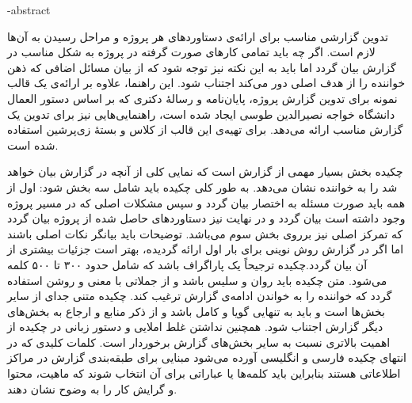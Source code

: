 \fa-abstract{
تدوین گزارشی مناسب برای ارائه‌ی دستاوردهای هر پروژه‌ و مراحل رسیدن به آن‌ها لازم است. اگر چه باید تمامی کارهای صورت گرفته در پروژه به شکل مناسب در گزارش بیان گردد اما باید به این نکته نیز توجه شود که از بیان مسائل اضافی که ذهن خواننده را از هدف اصلی دور می‌کند اجتناب شود. این راهنما، علاوه بر ارائه‌ی یک قالب نمونه‌ برای تدوین گزارش پروژه، پایان‌نامه و رسالهٔ دکتری که بر اساس دستور العمال دانشگاه خواجه نصیرالدین طوسی ایجاد شده است، راهنمایی‌هایی نیز برای تدوین یک گزارش مناسب ارائه می‌دهد. برای تهیه‌ی این قالب از کلاس 
و بستهٔ زی‌پرشین استفاده شده است.

چکیده بخش بسیار مهمی از گزارش است که نمایی کلی از آنچه در گزارش بیان خواهد شد را به خواننده نشان می‌دهد. به طور کلی چکیده باید شامل سه بخش شود: اول از همه باید صورت مسئله به اختصار بیان گردد و سپس مشکلات اصلی که در مسیر پروژه وجود داشته است بیان گردد و در نهایت نیز دستاوردهای حاصل شده از پروژه بیان گردد که تمرکز اصلی نیز برروی بخش سوم می‌باشد. توضیحات باید بیانگر نکات اصلی باشند اما اگر در گزارش روش نوینی برای بار اول ارائه گردیده، بهتر است جزئیات بیشتری از آن بیان گردد.چکیده ترجیحاً‌ یک پاراگراف باشد که شامل حدود ۳۰۰ تا ۵۰۰ کلمه می‌شود. متن چکیده باید روان و سلیس باشد و از جملاتی با معنی و روشن استفاده گردد که خواننده را به خواندن ادامه‌ی گزارش ترغیب کند. چکیده متنی جدای از سایر بخش‌ها است و باید به تنهایی گویا و کامل باشد و از ذکر منابع و ارجاع به بخش‌های دیگر گزارش اجتناب شود. همچنین نداشتن غلط املایی و دستور زبانی در چکیده از اهمیت بالاتری نسبت به سایر بخش‌های گزارش برخوردار است.
کلمات کلیدی که در انتهای چکیده فارسی و انگلیسی آورده می‌شود مبنایی برای طبقه‌بندی گزارش در مراکز اطلاعاتی هستند بنابراین باید  کلمه‌ها یا عباراتی برای آن انتخاب شوند که ماهیت، محتوا و گرایش کار را به وضوح نشان دهند.
}
